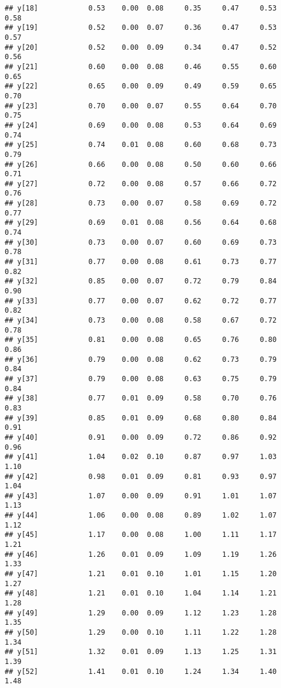 \documentclass{article}\usepackage[]{graphicx}\usepackage[]{color}
\makeatletter
\newenvironment{kframe}{%
 \def\at@end@of@kframe{}%
 \ifinner\ifhmode%
  \def\at@end@of@kframe{\end{minipage}}%
  \begin{minipage}{\columnwidth}%
 \fi\fi%
 \def\FrameCommand##1{\hskip\@totalleftmargin \hskip-\fboxsep
 \colorbox{shadecolor}{##1}\hskip-\fboxsep
     \hskip-\linewidth \hskip-\@totalleftmargin \hskip\columnwidth}%
 \MakeFramed {\advance\hsize-\width
   \@totalleftmargin\z@ \linewidth\hsize
   \@setminipage}}%
 {\par\unskip\endMakeFramed%
 \at@end@of@kframe}
\newenvironment{knitrout}{}{} %
\makeatother
\begin{document}
\begin{knitrout}
\begin{kframe}
\begin{verbatim}
## y[18]            0.53    0.00  0.08     0.35     0.47     0.53     0.58
## y[19]            0.52    0.00  0.07     0.36     0.47     0.53     0.57
## y[20]            0.52    0.00  0.09     0.34     0.47     0.52     0.56
## y[21]            0.60    0.00  0.08     0.46     0.55     0.60     0.65
## y[22]            0.65    0.00  0.09     0.49     0.59     0.65     0.70
## y[23]            0.70    0.00  0.07     0.55     0.64     0.70     0.75
## y[24]            0.69    0.00  0.08     0.53     0.64     0.69     0.74
## y[25]            0.74    0.01  0.08     0.60     0.68     0.73     0.79
## y[26]            0.66    0.00  0.08     0.50     0.60     0.66     0.71
## y[27]            0.72    0.00  0.08     0.57     0.66     0.72     0.76
## y[28]            0.73    0.00  0.07     0.58     0.69     0.72     0.77
## y[29]            0.69    0.01  0.08     0.56     0.64     0.68     0.74
## y[30]            0.73    0.00  0.07     0.60     0.69     0.73     0.78
## y[31]            0.77    0.00  0.08     0.61     0.73     0.77     0.82
## y[32]            0.85    0.00  0.07     0.72     0.79     0.84     0.90
## y[33]            0.77    0.00  0.07     0.62     0.72     0.77     0.82
## y[34]            0.73    0.00  0.08     0.58     0.67     0.72     0.78
## y[35]            0.81    0.00  0.08     0.65     0.76     0.80     0.86
## y[36]            0.79    0.00  0.08     0.62     0.73     0.79     0.84
## y[37]            0.79    0.00  0.08     0.63     0.75     0.79     0.84
## y[38]            0.77    0.01  0.09     0.58     0.70     0.76     0.83
## y[39]            0.85    0.01  0.09     0.68     0.80     0.84     0.91
## y[40]            0.91    0.00  0.09     0.72     0.86     0.92     0.96
## y[41]            1.04    0.02  0.10     0.87     0.97     1.03     1.10
## y[42]            0.98    0.01  0.09     0.81     0.93     0.97     1.04
## y[43]            1.07    0.00  0.09     0.91     1.01     1.07     1.13
## y[44]            1.06    0.00  0.08     0.89     1.02     1.07     1.12
## y[45]            1.17    0.00  0.08     1.00     1.11     1.17     1.21
## y[46]            1.26    0.01  0.09     1.09     1.19     1.26     1.33
## y[47]            1.21    0.01  0.10     1.01     1.15     1.20     1.27
## y[48]            1.21    0.01  0.10     1.04     1.14     1.21     1.28
## y[49]            1.29    0.00  0.09     1.12     1.23     1.28     1.35
## y[50]            1.29    0.00  0.10     1.11     1.22     1.28     1.34
## y[51]            1.32    0.01  0.09     1.13     1.25     1.31     1.39
## y[52]            1.41    0.01  0.10     1.24     1.34     1.40     1.48

\end{verbatim}
\end{kframe}
\end{knitrout}
\end{document}
